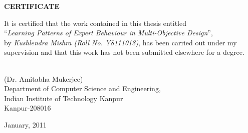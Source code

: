 \vspace*{1.0in}
\begin{center}
\begin{large}
{\bf CERTIFICATE}
\end{large}
\end{center}
\vskip 2cm
It is certified that the work contained in this thesis entitled 
\\``{{\textit{Learning Patterns of Expert Behaviour in Multi-Objective Design}}}'',\\ by 
{{\textit{Kushlendra Mishra (Roll No. Y8111018)}}}, has been carried out under my 
\\supervision and that this work has not been submitted elsewhere for a degree.
\vskip 1in
\begin{flushleft}
        \hspace*{5.8cm}{\hrulefill}\\
        \hspace*{5.8cm}(Dr. Amitabha Mukerjee)\\
        \hspace*{5.8cm}Department of Computer Science and Engineering,\\ 
        \hspace*{5.8cm}Indian Institute of Technology Kanpur\\
        \hspace*{5.8cm}Kanpur-208016
\end{flushleft}
January, 2011

